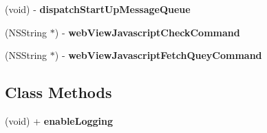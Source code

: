 \begin{DoxyCompactItemize}
(void) -\/ {\bfseries dispatch\+Start\+Up\+Message\+Queue}
\item 
\mbox{\label{interface_web_view_javascript_bridge_base_a9147becb5cec3c658493999fab15bd1f}} 
(N\+S\+String $\ast$) -\/ {\bfseries web\+View\+Javascript\+Check\+Command}
\item 
\mbox{\label{interface_web_view_javascript_bridge_base_ab29bdbf7880802b608777bef3f709518}} 
(N\+S\+String $\ast$) -\/ {\bfseries web\+View\+Javascript\+Fetch\+Quey\+Command}
\end{DoxyCompactItemize}
\subsection*{Class Methods}
\begin{DoxyCompactItemize}
\item 
\mbox{\label{interface_web_view_javascript_bridge_base_a04b7f992d52510b8bb084e5c41b93756}} 
(void) + {\bfseries enable\+Logging}
\end{DoxyCompactItemize}
